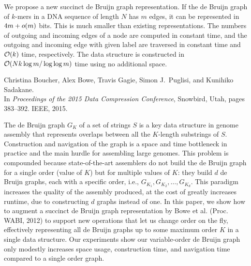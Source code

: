 \noindent
We propose a new succinct de Bruijn graph representation.  
If the de Bruijn graph of $k$-mers in a DNA sequence of length $N$ has $m$ edges,
it can be represented in $4m + o(m)$ bits.
This is much smaller than existing representations.
The numbers of outgoing and incoming edges of a node are computed in constant time, and
the outgoing and incoming edge with given label are traversed in constant time
and $\mathcal{O}(k)$ time, respectively.
The data structure is constructed in $\mathcal{O}(Nk \log m/\log\log m)$
time using no additional space.

{Christina Boucher, Alex Bowe, Travis Gagie, Simon J.~Puglisi, and Kunihiko Sadakane.\\
In \textit{Proceedings of the 2015 Data Compression Conference}, Snowbird, Utah, pages 383--392. IEEE, 2015.}

\noindent
The de Bruijn graph $G_K$ of a set of strings $S$ is a key data structure in 
genome assembly that represents overlaps between all the $K$-length substrings 
of $S$. Construction and navigation of the graph is a space and time bottleneck 
in practice and the main hurdle for assembling large genomes. 
This problem is compounded because state-of-the-art assemblers do not build the de Bruijn graph for a single order (value of $K$) but for multiple values of $K$: they build $d$ de Bruijn graphs, each with a specific order, i.e., $G_{K_1}, G_{K_2}, \ldots, G_{K_d}$.  
This paradigm increases the quality of the assembly produced, at the cost of greatly increases runtime, due to constructing $d$ graphs instead of one.
In this paper, we show how to augment a succinct de Bruijn graph 
representation by Bowe et al. (Proc. WABI, 2012) 
to support new operations that let us change order on the fly, effectively
representing all de Bruijn graphs up to some maximum order $K$ in
a single data structure. 
Our experiments show our variable-order de Bruijn graph only modestly increases
space usage, construction time, and navigation time compared to a single order graph.


